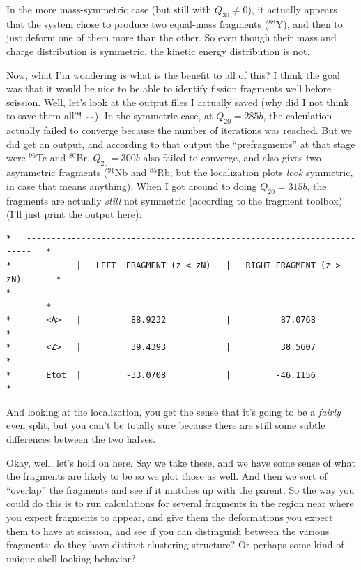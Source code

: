 \documentclass[]{report}
\begin{document}
In the more mass-symmetric case (but still with $Q_{30}\neq0$), it actually appears that the system chose to produce two equal-mass fragments ($^{88}$Y), and then to just deform one of them more than the other. So even though their mass and charge distribution is symmetric, the kinetic energy distribution is not.

Now, what I'm wondering is what is the benefit to all of this? I think the goal was that it would be nice to be able to identify fission fragments well before scission. Well, let's look at the output files I actually saved (why did I not think to save them all?! $\frown$). In the symmetric case, at $Q_{20}=285b$, the calculation actually failed to converge because the number of iterations was reached. But we did get an output, and according to that output the ``prefragments'' at that stage were $^{96}$Tc and $^{80}$Br. $Q_{20}=300b$ also failed to converge, and also gives two asymmetric fragments ($^{91}$Nb and $^{85}$Rb, but the localization plots \textit{look} symmetric, in case that means anything). When I got around to doing $Q_{20}=315b$, the fragments are actually \textit{still} not symmetric (according to the fragment toolbox) (I'll just print the output here):
\begin{verbatim}
*   -----------------------------------------------------------------------   *
*             |   LEFT  FRAGMENT (z < zN)   |   RIGHT FRAGMENT (z > zN)       *
*   -----------------------------------------------------------------------   *
*       <A>   |          88.9232            |          87.0768                *
*       <Z>   |          39.4393            |          38.5607                *
*       Etot  |         -33.0708            |         -46.1156                *
\end{verbatim}

\noindent And looking at the localization, you get the sense that it's going to be a \textit{fairly} even split, but you can't be totally sure because there are still some subtle differences between the two halves.

Okay, well, let's hold on here. Say we take these, and we have some sense of what the fragments are likely to be so we plot those as well. And then we sort of ``overlap'' the fragments and see if it matches up with the parent. So the way you could do this is to run calculations for several fragments in the region near where you expect fragments to appear, and give them the deformations you expect them to have at scission, and see if you can distinguish between the various fragments: do they have distinct clustering structure? Or perhaps some kind of unique shell-looking behavior?
\end{document}
